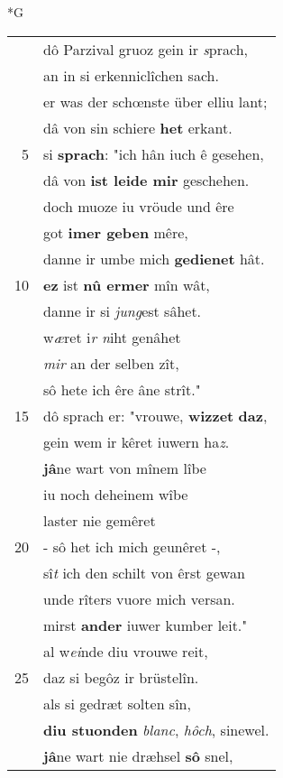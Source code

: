 \documentclass[8pt,a4paper,notitlepage]{article}
\begin{document}
\begin{table}[ht]
\begin{minipage}[t]{0.5\linewidth}
\small
\begin{center}*G
\end{center}
\begin{tabular}{rl}
 & dô Parzival gruoz gein ir \textit{s}prach,\\ 
 & an in si erkenniclîchen sach.\\ 
 & er was der schœnste über elliu lant;\\ 
 & dâ von sin schiere \textbf{het} erkant.\\ 
5 & si \textbf{sprach}: "ich hân iuch ê gesehen,\\ 
 & dâ von \textbf{ist leide mir} geschehen.\\ 
 & doch muoze iu vröude und êre\\ 
 & got \textbf{imer geben} mêre,\\ 
 & danne ir umbe mich \textbf{gedienet} hât.\\ 
10 & \textbf{ez} ist \textbf{nû ermer} mîn wât,\\ 
 & danne ir si \textit{jung}est sâhet.\\ 
 & w\textit{æ}ret i\textit{r n}iht genâhet\\ 
 & \textit{mir} an der selben zît,\\ 
 & sô hete ich êre âne strît."\\ 
15 & dô sprach er: "vrouwe, \textbf{wizzet} \textbf{daz},\\ 
 & gein wem ir kêret iuwern ha\textit{z}.\\ 
 & \textbf{jâ}ne wart von mînem lîbe\\ 
 & iu noch deheinem wîbe\\ 
 & laster nie gemêret\\ 
20 & - sô het ich mich geunêret -,\\ 
 & sî\textit{t} ich den schilt von êrst gewan\\ 
 & unde rîters vuore mich versan.\\ 
 & mirst \textbf{ander} iuwer kumber leit."\\ 
 & al w\textit{ei}nde diu vrouwe reit,\\ 
25 & daz si begôz ir brüstelîn.\\ 
 & als si gedræt solten sîn,\\ 
 & \textbf{diu stuonden} \textit{blanc}, \textit{hôch}, sinewel.\\ 
 & \textbf{jâ}ne wart nie dræhsel \textbf{sô} snel,\\ 

\end{tabular}
\end{minipage}
\end{table}
\end{document}
